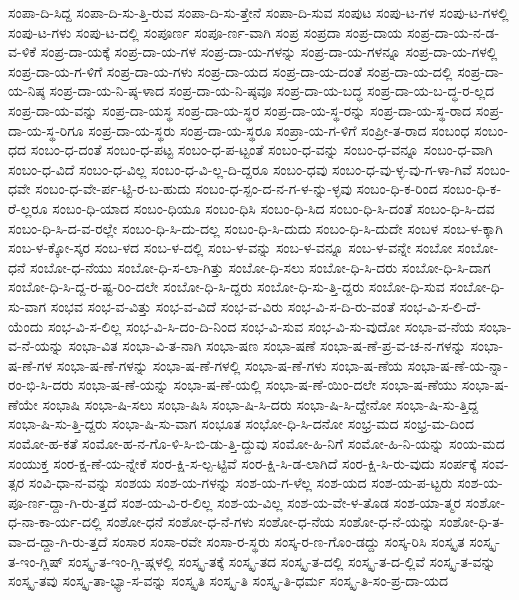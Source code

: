 {ಸಂಪಾ-ದಿ-ಸಿದ್ದ
ಸಂಪಾ-ದಿ-ಸು-ತ್ತಿ-ರುವ
ಸಂಪಾ-ದಿ-ಸು-ತ್ತೇನೆ
ಸಂಪಾ-ದಿ-ಸುವ
ಸಂಪುಟ
ಸಂಪು-ಟ-ಗಳ
ಸಂಪು-ಟ-ಗಳಲ್ಲಿ
ಸಂಪು-ಟ-ಗಳು
ಸಂಪು-ಟ-ದಲ್ಲಿ
ಸಂಪೂರ್ಣ
ಸಂಪೂ-ರ್ಣ-ವಾಗಿ
ಸಂಪ್ರ
ಸಂಪ್ರದಾ
ಸಂಪ್ರ-ದಾಯ
ಸಂಪ್ರ-ದಾ-ಯ-ನ-ಡ-ವ-ಳಿಕೆ
ಸಂಪ್ರ-ದಾ-ಯಕ್ಕೆ
ಸಂಪ್ರ-ದಾ-ಯ-ಗಳ
ಸಂಪ್ರ-ದಾ-ಯ-ಗಳನ್ನು
ಸಂಪ್ರ-ದಾ-ಯ-ಗಳನ್ನೂ
ಸಂಪ್ರ-ದಾ-ಯ-ಗಳಲ್ಲಿ
ಸಂಪ್ರ-ದಾ-ಯ-ಗ-ಳಿಗೆ
ಸಂಪ್ರ-ದಾ-ಯ-ಗಳು
ಸಂಪ್ರ-ದಾ-ಯದ
ಸಂಪ್ರ-ದಾ-ಯ-ದಂತೆ
ಸಂಪ್ರ-ದಾ-ಯ-ದಲ್ಲಿ
ಸಂಪ್ರ-ದಾ-ಯ-ನಿಷ್ಠ
ಸಂಪ್ರ-ದಾ-ಯ-ನಿ-ಷ್ಠ-ಳಾದ
ಸಂಪ್ರ-ದಾ-ಯ-ನಿ-ಷ್ಠವೂ
ಸಂಪ್ರ-ದಾ-ಯ-ಬದ್ಧ
ಸಂಪ್ರ-ದಾ-ಯ-ಬ-ದ್ಧ-ರ-ಲ್ಲದ
ಸಂಪ್ರ-ದಾ-ಯ-ವನ್ನು
ಸಂಪ್ರ-ದಾ-ಯಸ್ಥ
ಸಂಪ್ರ-ದಾ-ಯ-ಸ್ಥರ
ಸಂಪ್ರ-ದಾ-ಯ-ಸ್ಥ-ರನ್ನು
ಸಂಪ್ರ-ದಾ-ಯ-ಸ್ಥ-ರಾದ
ಸಂಪ್ರ-ದಾ-ಯ-ಸ್ಥ-ರಿಗೂ
ಸಂಪ್ರ-ದಾ-ಯ-ಸ್ಥರು
ಸಂಪ್ರ-ದಾ-ಯ-ಸ್ಥರೂ
ಸಂಪ್ರಾ-ಯ-ಗ-ಳಿಗೆ
ಸಂಪ್ರೀ-ತ-ರಾದ
ಸಂಬಂಧ
ಸಂಬಂ-ಧದ
ಸಂಬಂ-ಧ-ದಂತೆ
ಸಂಬಂ-ಧ-ಪಟ್ಟ
ಸಂಬಂ-ಧ-ಪ-ಟ್ಟಂತೆ
ಸಂಬಂ-ಧ-ವನ್ನು
ಸಂಬಂ-ಧ-ವನ್ನೂ
ಸಂಬಂ-ಧ-ವಾಗಿ
ಸಂಬಂ-ಧ-ವಿದೆ
ಸಂಬಂ-ಧ-ವಿಲ್ಲ
ಸಂಬಂ-ಧ-ವಿ-ಲ್ಲ-ದಿ-ದ್ದರೂ
ಸಂಬಂ-ಧವು
ಸಂಬಂ-ಧ-ವು-ಳ್ಳ-ವು-ಗ-ಳಾ-ಗಿವೆ
ಸಂಬಂ-ಧವೇ
ಸಂಬಂ-ಧ-ವೇ-ರ್ಪ-ಟ್ಟಿ-ರ-ಬ-ಹುದು
ಸಂಬಂ-ಧ-ಸ್ಪಂ-ದ-ನ-ಗ-ಳ-ನ್ನು-ಳ್ಳವು
ಸಂಬಂ-ಧಿ-ಕ-ರಿಂದ
ಸಂಬಂ-ಧಿ-ಕ-ರೆ-ಲ್ಲರೂ
ಸಂಬಂ-ಧಿ-ಯಾದ
ಸಂಬಂ-ಧಿಯೂ
ಸಂಬಂ-ಧಿಸಿ
ಸಂಬಂ-ಧಿ-ಸಿದ
ಸಂಬಂ-ಧಿ-ಸಿ-ದಂತೆ
ಸಂಬಂ-ಧಿ-ಸಿ-ದವ
ಸಂಬಂ-ಧಿ-ಸಿ-ದ-ವ-ರಲ್ಲೇ
ಸಂಬಂ-ಧಿ-ಸಿ-ದು-ದಲ್ಲ
ಸಂಬಂ-ಧಿ-ಸಿ-ದುದು
ಸಂಬಂ-ಧಿ-ಸಿ-ದುದೇ
ಸಂಬಳ
ಸಂಬ-ಳ-ಕ್ಕಾಗಿ
ಸಂಬ-ಳ-ಕ್ಕೋ-ಸ್ಕರ
ಸಂಬ-ಳದ
ಸಂಬ-ಳ-ದಲ್ಲಿ
ಸಂಬ-ಳ-ವನ್ನು
ಸಂಬ-ಳ-ವನ್ನೂ
ಸಂಬ-ಳ-ವನ್ನೇ
ಸಂಬೋ
ಸಂಬೋ-ಧನೆ
ಸಂಬೋ-ಧ-ನೆಯು
ಸಂಬೋ-ಧಿ-ಸ-ಲಾ-ಗಿತ್ತು
ಸಂಬೋ-ಧಿ-ಸಲು
ಸಂಬೋ-ಧಿ-ಸಿ-ದರು
ಸಂಬೋ-ಧಿ-ಸಿ-ದಾಗ
ಸಂಬೋ-ಧಿ-ಸಿ-ದ್ದ-ರ-ಷ್ಟ-ರಿಂ-ದಲೇ
ಸಂಬೋ-ಧಿ-ಸಿ-ದ್ದರು
ಸಂಬೋ-ಧಿ-ಸು-ತ್ತಿ-ದ್ದರು
ಸಂಬೋ-ಧಿ-ಸುವ
ಸಂಬೋ-ಧಿ-ಸು-ವಾಗ
ಸಂಭವ
ಸಂಭ-ವ-ವಿತ್ತು
ಸಂಭ-ವ-ವಿದೆ
ಸಂಭ-ವ-ವಿರು
ಸಂಭ-ವಿ-ಸ-ದಿ-ರು-ವಂತೆ
ಸಂಭ-ವಿ-ಸ-ಲಿ-ದೆ-ಯೆಂದು
ಸಂಭ-ವಿ-ಸ-ಲಿಲ್ಲ
ಸಂಭ-ವಿ-ಸಿ-ದಂ-ದಿ-ನಿಂದ
ಸಂಭ-ವಿ-ಸುವ
ಸಂಭ-ವಿ-ಸು-ವುದೋ
ಸಂಭಾ-ವ-ನೆಯ
ಸಂಭಾ-ವ-ನೆ-ಯನ್ನು
ಸಂಭಾ-ವಿತ
ಸಂಭಾ-ವಿ-ತ-ನಾಗಿ
ಸಂಭಾ-ಷಣ
ಸಂಭಾ-ಷಣೆ
ಸಂಭಾ-ಷ-ಣೆ-ಪ್ರ-ವ-ಚ-ನ-ಗಳನ್ನು
ಸಂಭಾ-ಷ-ಣೆ-ಗಳ
ಸಂಭಾ-ಷ-ಣೆ-ಗಳನ್ನು
ಸಂಭಾ-ಷ-ಣೆ-ಗಳಲ್ಲಿ
ಸಂಭಾ-ಷ-ಣೆ-ಗಳು
ಸಂಭಾ-ಷ-ಣೆಯ
ಸಂಭಾ-ಷ-ಣೆ-ಯ-ನ್ನಾ-ರಂ-ಭಿ-ಸಿ-ದರು
ಸಂಭಾ-ಷ-ಣೆ-ಯನ್ನು
ಸಂಭಾ-ಷ-ಣೆ-ಯಲ್ಲಿ
ಸಂಭಾ-ಷ-ಣೆ-ಯಿಂ-ದಲೇ
ಸಂಭಾ-ಷ-ಣೆಯು
ಸಂಭಾ-ಷ-ಣೆಯೇ
ಸಂಭಾಷಿ
ಸಂಭಾ-ಷಿ-ಸಲು
ಸಂಭಾ-ಷಿಸಿ
ಸಂಭಾ-ಷಿ-ಸಿ-ದರು
ಸಂಭಾ-ಷಿ-ಸಿ-ದ್ದೇನೋ
ಸಂಭಾ-ಷಿ-ಸು-ತ್ತಿದ್ದ
ಸಂಭಾ-ಷಿ-ಸು-ತ್ತಿ-ದ್ದರು
ಸಂಭಾ-ಷಿ-ಸು-ವಾಗ
ಸಂಭೂತ
ಸಂಭೋ-ಧಿ-ಸಿ-ದನೋ
ಸಂಭ್ರ-ಮದ
ಸಂಭ್ರ-ಮ-ದಿಂದ
ಸಂಮೋ-ಹ-ಕತೆ
ಸಂಮೋ-ಹ-ನ-ಗೊ-ಳಿ-ಸಿ-ಬಿ-ಡು-ತ್ತಿ-ದ್ದುವು
ಸಂಮೋ-ಹಿ-ನಿಗೆ
ಸಂಮೋ-ಹಿ-ನಿ-ಯನ್ನು
ಸಂಯ-ಮದ
ಸಂಯುಕ್ತ
ಸಂರ-ಕ್ಷ-ಣೆ-ಯ-ನ್ನೇಕೆ
ಸಂರ-ಕ್ಷಿ-ಸ-ಲ್ಪ-ಟ್ಟಿವೆ
ಸಂರ-ಕ್ಷಿ-ಸಿ-ಡ-ಲಾಗಿದೆ
ಸಂರ-ಕ್ಷಿ-ಸಿ-ರು-ವುದು
ಸಂರ್ಪಕ್ಕೆ
ಸಂವ-ತ್ಸರ
ಸಂವಿ-ಧಾ-ನ-ವನ್ನು
ಸಂಶಯ
ಸಂಶ-ಯ-ಗಳನ್ನು
ಸಂಶ-ಯ-ಗ-ಳೆಲ್ಲ
ಸಂಶ-ಯದ
ಸಂಶ-ಯ-ಪ-ಟ್ಟರು
ಸಂಶ-ಯ-ಪೂ-ರ್ಣ-ದ್ದಾ-ಗಿ-ರು-ತ್ತದೆ
ಸಂಶ-ಯ-ವಿ-ರ-ಲಿಲ್ಲ
ಸಂಶ-ಯ-ವಿಲ್ಲ
ಸಂಶ-ಯ-ವೇ-ಳ-ತೊಡ
ಸಂಶ-ಯಾ-ತ್ಮರ
ಸಂಶೋ-ಧ-ನಾ-ಕಾ-ರ್ಯ-ದಲ್ಲಿ
ಸಂಶೋ-ಧನೆ
ಸಂಶೋ-ಧ-ನೆ-ಗಳು
ಸಂಶೋ-ಧ-ನೆಯ
ಸಂಶೋ-ಧ-ನೆ-ಯನ್ನು
ಸಂಶೋ-ಧಿ-ತ-ವಾ-ದ-ದ್ದಾ-ಗಿ-ರು-ತ್ತದೆ
ಸಂಸಾರ
ಸಂಸಾ-ರವೇ
ಸಂಸಾ-ರ-ಸ್ಥರು
ಸಂಸ್ಕ-ರ-ಣ-ಗೊಂ-ಡದ್ದು
ಸಂಸ್ಕ-ರಿಸಿ
ಸಂಸ್ಕೃತ
ಸಂಸ್ಕೃ-ತ-ಇಂ-ಗ್ಲಿಷ್
ಸಂಸ್ಕೃ-ತ-ಇಂ-ಗ್ಲಿ-ಷ್ಗಳಲ್ಲಿ
ಸಂಸ್ಕೃ-ತಕ್ಕೆ
ಸಂಸ್ಕೃ-ತದ
ಸಂಸ್ಕೃ-ತ-ದಲ್ಲಿ
ಸಂಸ್ಕೃ-ತ-ದ-ಲ್ಲಿವೆ
ಸಂಸ್ಕೃ-ತ-ವನ್ನು
ಸಂಸ್ಕೃ-ತವು
ಸಂಸ್ಕೃ-ತಾ-ಭ್ಯಾ-ಸ-ವನ್ನು
ಸಂಸ್ಕೃತಿ
ಸಂಸ್ಕೃ-ತಿ
ಸಂಸ್ಕೃ-ತಿ-ಧರ್ಮ
ಸಂಸ್ಕೃ-ತಿ-ಸಂ-ಪ್ರ-ದಾ-ಯದ
}
